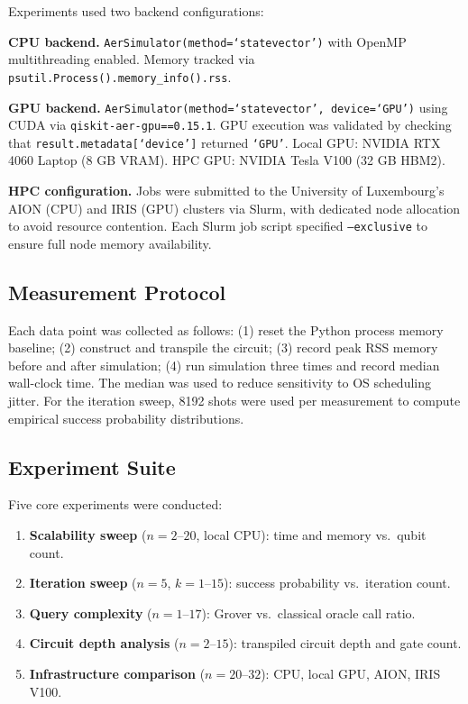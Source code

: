 \documentclass[sigconf, authorversion=true, nonacm=true]{acmart}
\begin{document}
Experiments used two backend configurations:

\textbf{CPU backend.} \texttt{AerSimulator(method=`statevector')} with OpenMP multithreading enabled. Memory tracked via \texttt{psutil.Process().memory\_info().rss}.

\textbf{GPU backend.} \texttt{AerSimulator(method=`statevector', device=`GPU')} using CUDA via \texttt{qiskit-aer-gpu==0.15.1}. GPU execution was validated by checking that \texttt{result.metadata[`device']} returned \texttt{`GPU'}. Local GPU: NVIDIA RTX 4060 Laptop (8 GB VRAM). HPC GPU: NVIDIA Tesla V100 (32 GB HBM2).

\textbf{HPC configuration.} Jobs were submitted to the University of Luxembourg's AION (CPU) and IRIS (GPU) clusters via Slurm, with dedicated node allocation to avoid resource contention. Each Slurm job script specified \texttt{--exclusive} to ensure full node memory availability.

\subsection{Measurement Protocol}

Each data point was collected as follows: (1) reset the Python process memory baseline; (2) construct and transpile the circuit; (3) record peak RSS memory before and after simulation; (4) run simulation three times and record median wall-clock time. The median was used to reduce sensitivity to OS scheduling jitter. For the iteration sweep, 8192 shots were used per measurement to compute empirical success probability distributions.

\subsection{Experiment Suite}

Five core experiments were conducted:

\begin{enumerate}
  \item \textbf{Scalability sweep} ($n = 2$--$20$, local CPU): time and memory vs.\ qubit count.
  \item \textbf{Iteration sweep} ($n=5$, $k=1$--$15$): success probability vs.\ iteration count.
  \item \textbf{Query complexity} ($n=1$--$17$): Grover vs.\ classical oracle call ratio.
  \item \textbf{Circuit depth analysis} ($n=2$--$15$): transpiled circuit depth and gate count.
  \item \textbf{Infrastructure comparison} ($n=20$--$32$): CPU, local GPU, AION, IRIS V100.
\end{enumerate}
\end{document}
